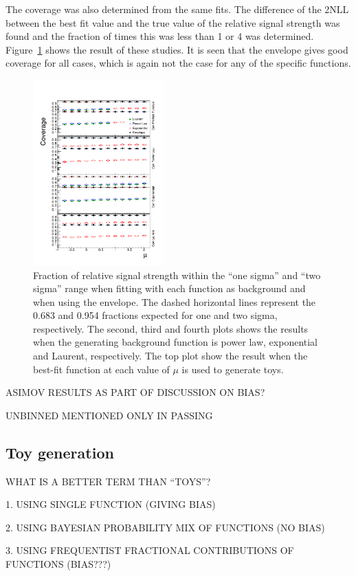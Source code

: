 The coverage was also determined from the same fits. The difference of the
2NLL between the best fit value and the true value of the relative signal 
strength was found and the fraction of times this was less than 1 or 4 was
determined. Figure~\ref{fig:functions:firstordercoverage}
shows the result of these studies. It is seen that the envelope gives good
coverage for all cases, which is again not the case for any of the specific 
functions.
%
\begin{figure}[tbp]
\centering
\includegraphics[width=0.45\textwidth]{functions/FirstOrderFunctions_Coverage.pdf}
\caption{Fraction of relative signal strength within the ``one sigma'' and
``two sigma'' range when fitting with each function as background and when
using the envelope. The dashed horizontal
lines represent the 0.683 and 0.954 fractions
expected for one and two sigma, respectively.
The second, third and fourth plots shows the results
when the generating background function is power law, exponential and Laurent,
respectively. The top plot show the result when the best-fit function at each
value of $\mu$ is used to generate toys.}
\label{fig:functions:firstordercoverage}
\end{figure}


ASIMOV RESULTS AS PART OF DISCUSSION ON BIAS?

UNBINNED MENTIONED ONLY IN PASSING


\subsection{Toy generation}
\label{sec:functions:toys}

WHAT IS A BETTER TERM THAN ``TOYS''?

1. USING SINGLE FUNCTION (GIVING BIAS)

2. USING BAYESIAN PROBABILITY MIX OF FUNCTIONS (NO BIAS)

3. USING FREQUENTIST FRACTIONAL CONTRIBUTIONS OF FUNCTIONS (BIAS???)

